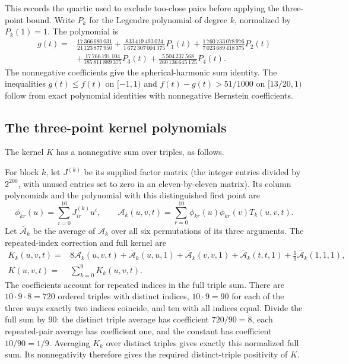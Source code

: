 \documentclass[11pt]{article}
\begin{document}
\begin{appendices}
This records the quartic used to exclude too-close pairs before applying
the three-point bound. Write $P_k$ for the Legendre polynomial of degree
$k$, normalized by $P_k(1)=1$. The polynomial is
\begin{align*}
 g(t)={}&\frac{17\,366\,680\,031}{21\,123\,877\,950}
 +\frac{833\,419\,493\,024}{1\,672\,307\,004\,375}P_1(t)
 +\frac{1\,760\,733\,078\,976}{7\,023\,689\,418\,375}P_2(t)\\
 &+\frac{17\,766\,191\,104}{185\,811\,889\,375}P_3(t)
 +\frac{5\,504\,237\,568}{260\,136\,645\,125}P_4(t).
\end{align*}
The nonnegative coefficients give the spherical-harmonic sum identity.
The inequalities $g(t)\leq f(t)$ on $[-1,1)$ and
$f(t)-g(t)>51/1000$ on $[13/20,1)$ follow from exact polynomial
identities with nonnegative Bernstein coefficients.

\subsection{The three-point kernel polynomials}\label{app:kernels}
The kernel $K$ has a nonnegative sum over triples, as follows.



For block $k$, let $J^{(k)}$ be its supplied factor matrix (the integer
entries divided by $2^{200}$, with unused entries set to zero in an
eleven-by-eleven matrix).
Its column polynomials and the polynomial with this distinguished first
point are
\[
 \phi_{kr}(u)=\sum_{i=0}^{10}J^{(k)}_{ir}u^i,\qquad
 \mathcal A_k(u,v,t)=\sum_{r=0}^{10}\phi_{kr}(u)\phi_{kr}(v)T_k(u,v,t).
\]
Let $\overline{\mathcal A}_k$ be the average of $\mathcal A_k$ over all six permutations
of its three arguments. The repeated-index correction and full kernel
are
\begin{align*}
 K_k(u,v,t)={}&8\overline{\mathcal A}_k(u,v,t)+\overline{\mathcal A}_k(u,u,1)
 +\overline{\mathcal A}_k(v,v,1)+\overline{\mathcal A}_k(t,t,1)
 +\tfrac19\overline{\mathcal A}_k(1,1,1),\\
 K(u,v,t)={}&\sum_{k=0}^{9}K_k(u,v,t).
\end{align*}
The coefficients account for repeated indices in the full triple sum.
There are $10\cdot9\cdot8=720$ ordered triples with distinct indices,
$10\cdot9=90$ for each of the three ways exactly two indices coincide,
and ten with all indices equal. Divide the full sum by 90: the distinct
triple average has coefficient $720/90=8$, each repeated-pair average
has coefficient one, and the constant has coefficient $10/90=1/9$.
Averaging $K_k$ over distinct triples gives exactly this normalized full
sum. Its nonnegativity therefore gives the required distinct-triple
positivity of $K$.



\end{appendices}
\end{document}
